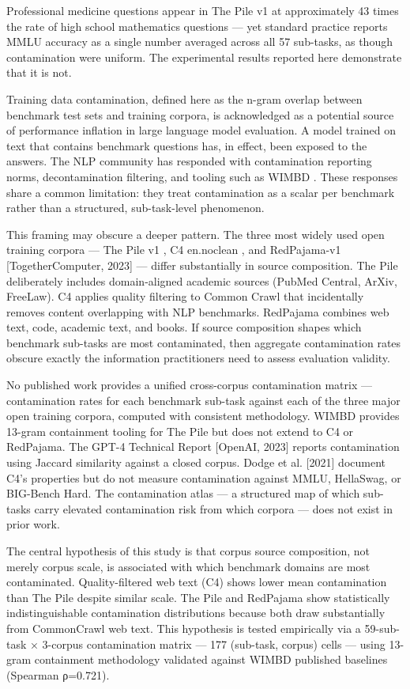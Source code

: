 
Professional medicine questions appear in The Pile v1 at approximately 43 times the rate of high school mathematics questions — yet standard practice reports MMLU accuracy as a single number averaged across all 57 sub-tasks, as though contamination were uniform. The experimental results reported here demonstrate that it is not.

Training data contamination, defined here as the n-gram overlap between benchmark test sets and training corpora, is acknowledged as a potential source of performance inflation in large language model evaluation. A model trained on text that contains benchmark questions has, in effect, been exposed to the answers. The NLP community has responded with contamination reporting norms, decontamination filtering, and tooling such as WIMBD \citep{Elazaretal2023}. These responses share a common limitation: they treat contamination as a scalar per benchmark rather than a structured, sub-task-level phenomenon.

This framing may obscure a deeper pattern. The three most widely used open training corpora — The Pile v1 \citep{Gaoetal2020}, C4 en.noclean \citep{Dodgeetal2021}, and RedPajama-v1 [TogetherComputer, 2023] — differ substantially in source composition. The Pile deliberately includes domain-aligned academic sources (PubMed Central, ArXiv, FreeLaw). C4 applies quality filtering to Common Crawl that incidentally removes content overlapping with NLP benchmarks. RedPajama combines web text, code, academic text, and books. If source composition shapes which benchmark sub-tasks are most contaminated, then aggregate contamination rates obscure exactly the information practitioners need to assess evaluation validity.

No published work provides a unified cross-corpus contamination matrix — contamination rates for each benchmark sub-task against each of the three major open training corpora, computed with consistent methodology. WIMBD \citep{Elazaretal2023} provides 13-gram containment tooling for The Pile but does not extend to C4 or RedPajama. The GPT-4 Technical Report [OpenAI, 2023] reports contamination using Jaccard similarity against a closed corpus. Dodge et al. [2021] document C4's properties but do not measure contamination against MMLU, HellaSwag, or BIG-Bench Hard. The contamination atlas — a structured map of which sub-tasks carry elevated contamination risk from which corpora — does not exist in prior work.

The central hypothesis of this study is that corpus source composition, not merely corpus scale, is associated with which benchmark domains are most contaminated. Quality-filtered web text (C4) shows lower mean contamination than The Pile despite similar scale. The Pile and RedPajama show statistically indistinguishable contamination distributions because both draw substantially from CommonCrawl web text. This hypothesis is tested empirically via a 59-sub-task × 3-corpus contamination matrix — 177 (sub-task, corpus) cells — using 13-gram containment methodology validated against WIMBD published baselines (Spearman ρ=0.721).

